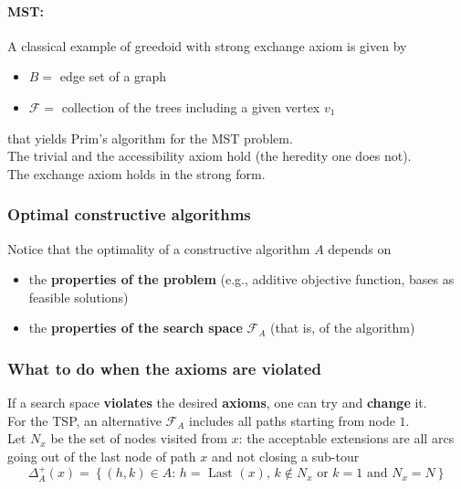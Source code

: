 \paragraph{MST:} A classical example of greedoid with strong exchange axiom is given by
\begin{itemize}
	\item $B =$ edge set of a graph
	\item $\mathcal{F} =$ collection of the trees including a given vertex $v_1$
\end{itemize}
that yields Prim’s algorithm for the MST problem.\\

The trivial and the accessibility axiom hold (the heredity one does not).\\
The exchange axiom holds in the strong form.\\

\vfill

\subsubsection*{Optimal constructive algorithms}
Notice that the optimality of a constructive algorithm $A$ depends on
\begin{itemize}
	\item the \textbf{properties of the problem} (e.g., additive objective function, bases as feasible solutions)
	\item the \textbf{properties of the search space} $\mathcal{F}_A$ (that is, of the algorithm)
\end{itemize}


\newpage

\subsubsection{What to do when the axioms are violated}
If a search space \textbf{violates} the desired \textbf{axioms}, one can try and \textbf{change} it.\\

For the TSP, an alternative $\mathcal{F}_A$ includes all paths starting from node $1$.\\
Let $N_x$ be the set of nodes visited from $x$: the acceptable extensions are all arcs going out of the last node of path $x$ and not closing a sub-tour
$$ \Delta_A^+ (x) = \left\{(h,k) \in A : \, h = \text{ Last } (x), \, k \notin N_x \text{ or } k = 1 \text{ and } N_x = N \right\} $$

